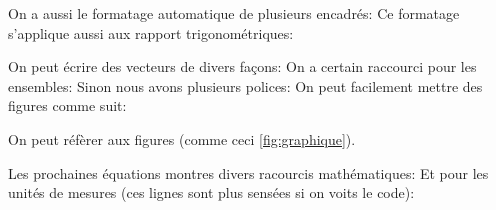 \documentclass[12pt, a4paper]{article}
\begin{document}
On a aussi le formatage automatique de plusieurs encadrés:
Ce formatage s'applique aussi aux rapport trigonométriques:

On peut écrire des vecteurs de divers façons:
On a certain raccourci pour les ensembles:
\eqn{
    \N~\Z~\R~\C
}
Sinon nous avons plusieurs polices:
On peut facilement mettre des figures comme suit:

On peut réfèrer aux figures (comme ceci \ref{fig:graphique}).

Les prochaines équations montres divers racourcis mathématiques:
Et pour les unités de mesures (ces lignes sont plus sensées si on voits le code):
\end{document}
